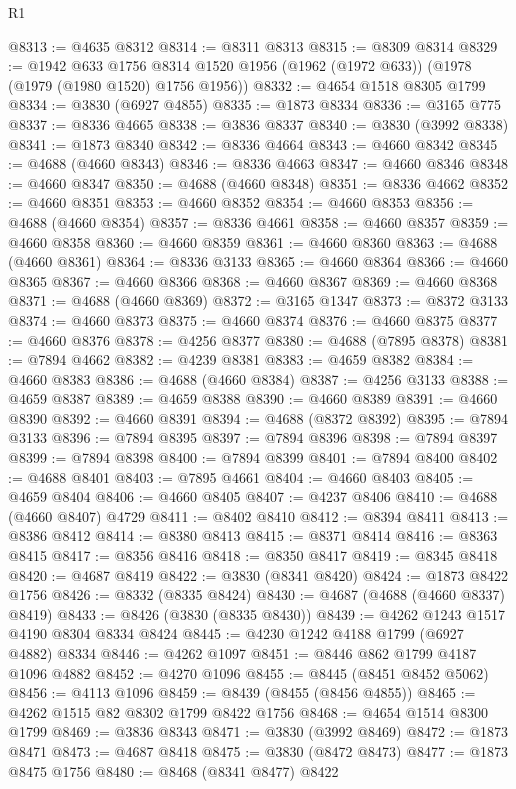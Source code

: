 \begin{lexlean}{R1}
\begin{coremodule}
@8313 := @4635 @8312
@8314 := @8311 @8313
@8315 := @8309 @8314
@8329 := @1942
    @633
    @1756
    @8314
    @1520
    @1956
    (@1962 (@1972 @633))
    (@1978 (@1979 (@1980 @1520) @1756 @1956))
@8332 := @4654 @1518 @8305 @1799
@8334 := @3830 (@6927 @4855)
@8335 := @1873 @8334
@8336 := @3165 @775
@8337 := @8336 @4665
@8338 := @3836 @8337
@8340 := @3830 (@3992 @8338)
@8341 := @1873 @8340
@8342 := @8336 @4664
@8343 := @4660 @8342
@8345 := @4688 (@4660 @8343)
@8346 := @8336 @4663
@8347 := @4660 @8346
@8348 := @4660 @8347
@8350 := @4688 (@4660 @8348)
@8351 := @8336 @4662
@8352 := @4660 @8351
@8353 := @4660 @8352
@8354 := @4660 @8353
@8356 := @4688 (@4660 @8354)
@8357 := @8336 @4661
@8358 := @4660 @8357
@8359 := @4660 @8358
@8360 := @4660 @8359
@8361 := @4660 @8360
@8363 := @4688 (@4660 @8361)
@8364 := @8336 @3133
@8365 := @4660 @8364
@8366 := @4660 @8365
@8367 := @4660 @8366
@8368 := @4660 @8367
@8369 := @4660 @8368
@8371 := @4688 (@4660 @8369)
@8372 := @3165 @1347
@8373 := @8372 @3133
@8374 := @4660 @8373
@8375 := @4660 @8374
@8376 := @4660 @8375
@8377 := @4660 @8376
@8378 := @4256 @8377
@8380 := @4688 (@7895 @8378)
@8381 := @7894 @4662
@8382 := @4239 @8381
@8383 := @4659 @8382
@8384 := @4660 @8383
@8386 := @4688 (@4660 @8384)
@8387 := @4256 @3133
@8388 := @4659 @8387
@8389 := @4659 @8388
@8390 := @4660 @8389
@8391 := @4660 @8390
@8392 := @4660 @8391
@8394 := @4688 (@8372 @8392)
@8395 := @7894 @3133
@8396 := @7894 @8395
@8397 := @7894 @8396
@8398 := @7894 @8397
@8399 := @7894 @8398
@8400 := @7894 @8399
@8401 := @7894 @8400
@8402 := @4688 @8401
@8403 := @7895 @4661
@8404 := @4660 @8403
@8405 := @4659 @8404
@8406 := @4660 @8405
@8407 := @4237 @8406
@8410 := @4688 (@4660 @8407) @4729
@8411 := @8402 @8410
@8412 := @8394 @8411
@8413 := @8386 @8412
@8414 := @8380 @8413
@8415 := @8371 @8414
@8416 := @8363 @8415
@8417 := @8356 @8416
@8418 := @8350 @8417
@8419 := @8345 @8418
@8420 := @4687 @8419
@8422 := @3830 (@8341 @8420)
@8424 := @1873 @8422 @1756
@8426 := @8332 (@8335 @8424)
@8430 := @4687 (@4688 (@4660 @8337) @8419)
@8433 := @8426 (@3830 (@8335 @8430))
@8439 := @4262 @1243 @1517 @4190 @8304 @8334 @8424
@8445 := @4230 @1242 @4188 @1799 (@6927 @4882) @8334
@8446 := @4262 @1097
@8451 := @8446 @862 @1799 @4187 @1096 @4882
@8452 := @4270 @1096
@8455 := @8445 (@8451 @8452 @5062)
@8456 := @4113 @1096
@8459 := @8439 (@8455 (@8456 @4855))
@8465 := @4262 @1515 @82 @8302 @1799 @8422 @1756
@8468 := @4654 @1514 @8300 @1799
@8469 := @3836 @8343
@8471 := @3830 (@3992 @8469)
@8472 := @1873 @8471
@8473 := @4687 @8418
@8475 := @3830 (@8472 @8473)
@8477 := @1873 @8475 @1756
@8480 := @8468 (@8341 @8477) @8422

\end{coremodule}
\end{lexlean}
